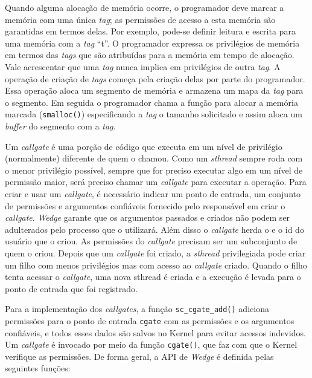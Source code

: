 Quando alguma alocação de memória ocorre, o programador deve marcar a memória
com uma única \emph{tag}; as permissões de acesso a esta memória são garantidas
em termos delas. Por exemplo, pode-se definir leitura e escrita para uma
memória com a \emph{tag} ``t''. O programador expressa os privilégios de memória
em termos das \emph{tags} que são atribuídas para a memória em tempo de
alocação. Vale acrescentar que uma \emph{tag} nunca implica em privilégios de
outra \emph{tag}. A operação de criação de \emph{tags} começa pela criação delas
por parte do programador. Essa operação aloca um segmento de memória e armazena
um mapa da \emph{tag} para o segmento. Em seguida o programador chama a função
para alocar a memória marcada (\texttt{smalloc()}) especificando a \emph{tag} o
tamanho solicitado e assim aloca um \emph{buffer} do segmento com a \emph{tag}.

Um \emph{callgate} é uma porção de código que executa em um nível de privilégio
(normalmente) diferente de quem o chamou. Como um \emph{sthread} sempre roda
com o menor privilégio possível, sempre que for preciso executar algo em um
nível de permissão maior, será preciso chamar um \emph{callgate} para executar
a operação. Para criar e usar um \emph{callgate}, é necessário indicar um ponto
de entrada, um conjunto de permissões e argumentos confiáveis fornecido pelo
responsável em criar o \emph{callgate}. \emph{Wedge} garante que os
argumentos passados e criados não podem ser adulterados pelo processo que o
utilizará. Além disso o \emph{callgate} herda o  e o id do
usuário que o criou. As permissões do \emph{callgate} precisam ser um
subconjunto de quem o criou. Depois que um \emph{callgate} foi criado, a
\emph{sthread} privilegiada pode criar um filho com menos privilégios mas com
acesso ao \emph{callgate} criado. Quando o filho tenta acessar o
\emph{callgate}, uma nova sthread é criada e a execução é levada para o ponto de
entrada que foi registrado.

Para a implementação dos \emph{callgates}, a função \texttt{sc\_cgate\_add()}
adiciona permissões para o ponto de entrada \texttt{cgate} com as permissões e
os argumentos confiáveis, e todos esses dados são salvos no Kernel para evitar
acessos indevidos. Um \emph{callgate} é invocado por meio da função
\texttt{cgate()}, que faz com que o Kernel verifique as permissões. De forma
geral, a API de \emph{Wedge} é definida pelas seguintes funções:

